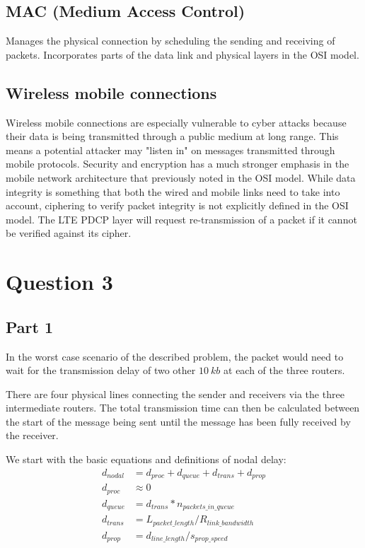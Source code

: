 \documentclass[12pt,letterpaper]{article}
\begin{document}
\subsection*{MAC (Medium Access Control)}
Manages the physical connection by scheduling the sending and receiving of
packets. Incorporates parts of the data link and physical layers in the OSI model.

\subsection*{Wireless mobile connections}
Wireless mobile connections are especially vulnerable to cyber attacks because their
data is being transmitted through a public medium at long range. This means a potential
attacker may "listen in" on messages transmitted through mobile protocols. Security and
encryption has a much stronger emphasis in the mobile network architecture that previously
noted in the OSI model. While data integrity is something that both the wired and mobile
links need to take into account, ciphering to verify packet integrity is not explicitly
defined in the OSI model. The LTE PDCP layer will request re-transmission of a packet if
it cannot be verified against its cipher.

\section*{Question 3}
\subsection*{Part 1}
In the worst case scenario of the described problem, the packet would need to wait
for the transmission delay of two other $\SI{10}{kb}$ at each of the three
routers.

There are four physical lines connecting the sender and receivers via the three
intermediate routers. The total transmission time can then be calculated between
the start of the message being sent until the message has been fully received by
the receiver.

We start with the basic equations and definitions of nodal delay:
\begin{align}
d_{nodal} &= d_{proc} + d_{queue} + d_{trans} + d_{prop} \\
d_{proc} &\approx 0 \\
d_{queue} &= d_{trans} * n_{packets\_in\_queue} \\
d_{trans} &= L_{packet\_length} / R_{link\_bandwidth} \\
d_{prop} &= d_{line\_length} / s_{prop\_speed} 
\end{align}
\end{document}
